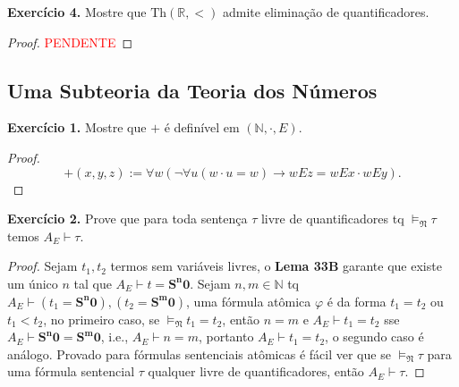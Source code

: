 \documentclass[11pt]{article}
\newcommand{\mf}[1]{\mathfrak{#1}}
\newcommand{\mbb}[1]{\mathbb{#1}}
\newcommand{\subs}[2]{
    \setcounter{subsection}{#1 - 1}
    \subsection{#2}
    }
\newcommand{\rp}[1]{{\left(#1\right)}}
\begin{document}
\begin{shaded}
\textbf{Exercício 4.} Mostre que $\text{Th}(\mbb{R},<)$ admite eliminação de quantificadores.
\end{shaded}

\begin{proof}
    \begin{comment}
    Devido ao \textbf{Teorema 31F}, basta provarmos que fórmulas da forma $\exists x(\alpha_0\wedge\dots\wedge\alpha_n)$ possuem eliminação de quantificadores, onde cada $\alpha_i$ é um literal. Primeiro podemos remover literais negados, como toda fórmula atômica é da forma $x<t,x=t$, então substitua $\neg(x<t)$ por $t<x\vee t=x$ e $\neg(x=t)$ por $x<t\wedge t<x$, além disso, para toda fórmula da forma $\exists x(\varphi\wedge x=t)$ substitua-a por $\varphi\tfrac{t}{x}$, logo toda fórmula ficará da forma
    $$\exists x\rp{\bigwedge_{1\leq i\leq n}x<t_i\wedge\bigwedge_{1\leq j\leq m}t_j<x}$$
    se $n,m\neq0$, basta aplicarmos o método de Fourier-Motzkin para eliminar variáveis, se $n=0$, substitua a fórmula por $x=\max(t_1,\dots,t_m)+1$
    \end{comment}
    \textcolor{red}{PENDENTE}
\end{proof}

\subs{3}{Uma Subteoria da Teoria dos Números}

\begin{shaded}
\textbf{Exercício 1.} Mostre que $+$ é definível em $(\mbb{N},\cdot,E)$.
\end{shaded}

\begin{proof}
    $$+(x,y,z):=\forall w(\neg\forall u(w\cdot u=w)\to wEz=wEx\cdot wEy).$$
\end{proof}

\begin{shaded}
\textbf{Exercício 2.} Prove que para toda sentença $\tau$ livre de quantificadores tq $\vDash_\mf{N}\tau$ temos $A_E\vdash\tau$.
\end{shaded}

\begin{proof}
    Sejam $t_1,t_2$ termos sem variáveis livres, o \textbf{Lema 33B} garante que existe um único $n$ tal que $A_E\vdash t=\mathbf{S^n0}$. Sejam $n,m\in\mbb{N}$ tq $A_E\vdash(t_1=\mathbf{S^n0}),(t_2=\mathbf{S^m0})$, uma fórmula atômica $\varphi$ é da forma $t_1=t_2$ ou $t_1<t_2$, no primeiro caso, se $\vDash_\mf{N}t_1=t_2$, então $n=m$ e $A_E\vdash t_1=t_2$ sse $A_E\vdash \mathbf{S^n0}=\mathbf{S^m0}$, i.e., $A_E\vdash n=m$, portanto $A_E\vdash t_1=t_2$, o segundo caso é análogo. Provado para fórmulas sentenciais atômicas é fácil ver que se $\vDash_\mf{N}\tau$ para uma fórmula sentencial $\tau$ qualquer livre de quantificadores, então $A_E\vdash\tau$.
\end{proof}
\end{document}
